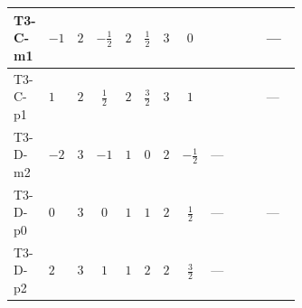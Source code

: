 \documentclass[8pt]{article}
\begin{document}
\begin{landscape}
\begin{longtable}{@{}llcccccc >{\raggedright\arraybackslash}p{0.21\linewidth} >{\raggedright\arraybackslash}p{0.21\linewidth} >{\raggedright\arraybackslash}p{0.21\linewidth}@{}}
\midrule
T3-C-m1 & $-1$ & $2$ & $-\frac{1}{2}$ & $2$ & $\frac{1}{2}$ & $3$ & $0$ & \scriptsize\adjustbox{max width=\linewidth}{$\begin{gathered} 6 {\lambda_{S_1}^{(1)}} T_{\nu}^{(1)}\end{gathered}$} & \scriptsize\adjustbox{max width=\linewidth}{$\begin{gathered} -5 \operatorname{Tr}\!\left({y_1}\,\left({y_1}\right)^{\dagger}\,{y_1}\,\left({y_1}\right)^{\dagger}\right)\end{gathered}$} & --- \\
\midrule
T3-C-p1 & $1$ & $2$ & $\frac{1}{2}$ & $2$ & $\frac{3}{2}$ & $3$ & $1$ & \scriptsize\adjustbox{max width=\linewidth}{$\begin{gathered} 6 {\lambda_{S_1}^{(1)}} T_{\nu}^{(1)}\end{gathered}$} & \scriptsize\adjustbox{max width=\linewidth}{$\begin{gathered} -5 \operatorname{Tr}\!\left({y_1}\,\left({y_1}\right)^{\dagger}\,{y_1}\,\left({y_1}\right)^{\dagger}\right)\end{gathered}$} & --- \\
\midrule
T3-D-m2 & $-2$ & $3$ & $-1$ & $1$ & $0$ & $2$ & $-\frac{1}{2}$ & --- & \scriptsize\adjustbox{max width=\linewidth}{$\begin{gathered} -3 \operatorname{Tr}\!\left({y_1}\,\left({y_1}\right)^{\dagger}\,{y_1}\,\left({y_1}\right)^{\dagger}\right)\end{gathered}$} & \scriptsize\adjustbox{max width=\linewidth}{$\begin{gathered} +12 {g_1}^4\end{gathered}$} \\
\midrule
T3-D-p0 & $0$ & $3$ & $0$ & $1$ & $1$ & $2$ & $\frac{1}{2}$ & --- & \scriptsize\adjustbox{max width=\linewidth}{$\begin{gathered} -3 \operatorname{Tr}\!\left({y_1}\,\left({y_1}\right)^{\dagger}\,{y_1}\,\left({y_1}\right)^{\dagger}\right)\end{gathered}$} & --- \\
\midrule
T3-D-p2 & $2$ & $3$ & $1$ & $1$ & $2$ & $2$ & $\frac{3}{2}$ & --- & \scriptsize\adjustbox{max width=\linewidth}{$\begin{gathered} -3 \operatorname{Tr}\!\left({y_1}\,\left({y_1}\right)^{\dagger}\,{y_1}\,\left({y_1}\right)^{\dagger}\right)\end{gathered}$} & \scriptsize\adjustbox{max width=\linewidth}{$\begin{gathered} +12 {g_1}^4\end{gathered}$} \\

\end{longtable}
\end{landscape}
\end{document}
